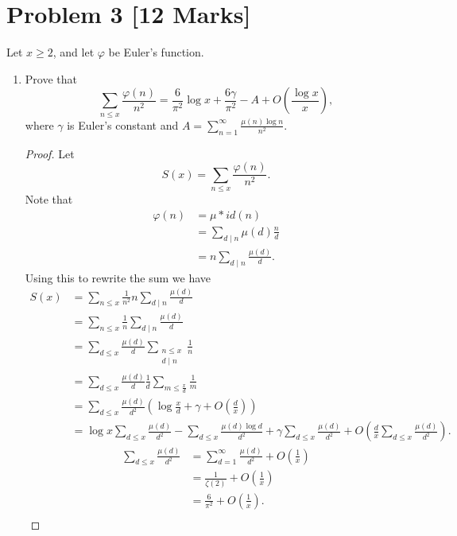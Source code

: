 \documentclass[12pt]{article}
\begin{document}
\section*{Problem 3 [12 Marks]}
Let $x\geq2$, and let $\varphi$ be Euler's function.
\begin{enumerate}[label=(\alph*)]
    \item Prove that 
    \[
        \sum_{n\leq x}\frac{\varphi(n)}{n^2}=\frac{6}{\pi^2}\log x+\frac{6\gamma}{\pi^2}-A+O\left(\frac{\log x}{x}\right),
    \]
    where $\gamma$ is Euler's constant and $A=\sum_{n=1}^{\infty}\frac{\mu(n)\log n}{n^2}$.
    \begin{proof}
        Let 
        \[
            S(x)=\sum_{n\leq x}\frac{\varphi(n)}{n^2}.
        \]
        Note that 
        \begin{align*}
            \varphi(n)&=\mu\ast id(n)\\
            &=\sum_{d\mid n}\mu(d)\frac{n}{d}\\
            &=n\sum_{d\mid n}\frac{\mu(d)}{d}.
        \end{align*}
        Using this to rewrite the sum we have
        \begin{align*}
            S(x)&=\sum_{n\leq x}\frac{1}{n^2}n\sum_{d\mid n}\frac{\mu(d)}{d}\\
            &=\sum_{n\leq x}\frac{1}{n}\sum_{d\mid n}\frac{\mu(d)}{d}\\
            &=\sum_{d\leq x}\frac{\mu(d)}{d}\sum_{\substack{n\leq x\\ d\mid n}}\frac{1}{n}\\
            &=\sum_{d\leq x}\frac{\mu(d)}{d}\frac{1}{d}\sum_{m\leq\frac{x}{d}}\frac{1}{m}\\
            &=\sum_{d\leq x}\frac{\mu(d)}{d^2}\left(\log\frac{x}{d}+\gamma+O\left(\frac{d}{x}\right)\right)\\
            &=\log x\sum_{d\leq x}\frac{\mu(d)}{d^2}-\sum_{d\leq x}\frac{\mu(d)\log d}{d^2}+\gamma\sum_{d\leq x}\frac{\mu(d)}{d^2}+O\left(\frac{d}{x}\sum_{d\leq x}\frac{\mu(d)}{d^2}\right).
        \end{align*}
        \begin{align*}
            \sum_{d\leq x}\frac{\mu(d)}{d^2}&=\sum_{d=1}^{\infty}\frac{\mu(d)}{d^2}+O\left(\frac{1}{x}\right)\\
            &=\frac{1}{\zeta(2)}+O\left(\frac{1}{x}\right)\\
            &=\frac{6}{\pi^2}+O\left(\frac{1}{x}\right).
        \end{align*}
        \begin{align*}

\end{align*}
\end{proof}
\end{enumerate}
\end{document}
